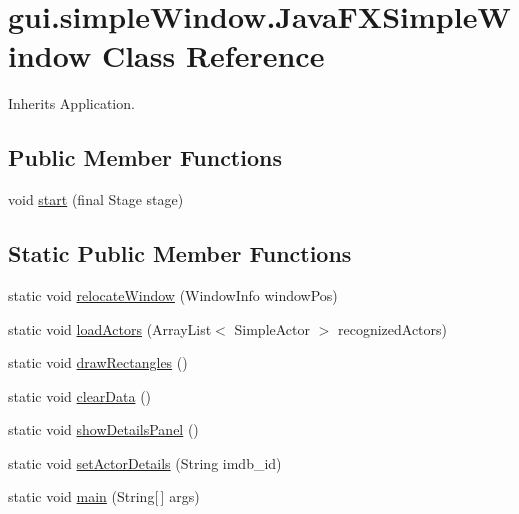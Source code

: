 \hypertarget{classgui_1_1simple_window_1_1_java_f_x_simple_window}{}\section{gui.\+simple\+Window.\+Java\+F\+X\+Simple\+Window Class Reference}
\label{classgui_1_1simple_window_1_1_java_f_x_simple_window}


Inherits Application.

\subsection*{Public Member Functions}
\begin{DoxyCompactItemize}
\item 
void \hyperlink{classgui_1_1simple_window_1_1_java_f_x_simple_window_a7b20469c1f1382b5d082c8ba85676777}{start} (final Stage stage)
\end{DoxyCompactItemize}
\subsection*{Static Public Member Functions}
\begin{DoxyCompactItemize}
\item 
static void \hyperlink{classgui_1_1simple_window_1_1_java_f_x_simple_window_a6e6c7fd72c5d662619c16bbeb2050e3f}{relocate\+Window} (Window\+Info window\+Pos)
\item 
static void \hyperlink{classgui_1_1simple_window_1_1_java_f_x_simple_window_a0e3bf876c67e39d1f7ae354c971ecf7f}{load\+Actors} (Array\+List$<$ Simple\+Actor $>$ recognized\+Actors)
\item 
static void \hyperlink{classgui_1_1simple_window_1_1_java_f_x_simple_window_a8e476138f5131bf777c43baaa51d7028}{draw\+Rectangles} ()
\item 
static void \hyperlink{classgui_1_1simple_window_1_1_java_f_x_simple_window_a5e73d1d6c1d7f6ad7e262d40e41b8a39}{clear\+Data} ()
\item 
static void \hyperlink{classgui_1_1simple_window_1_1_java_f_x_simple_window_a04c15534cde88328f9b6933774fa87e3}{show\+Details\+Panel} ()
\item 
static void \hyperlink{classgui_1_1simple_window_1_1_java_f_x_simple_window_abcf21b43abf2d83b9714da096ca0bd7b}{set\+Actor\+Details} (String imdb\+\_\+id)
\item 
static void \hyperlink{classgui_1_1simple_window_1_1_java_f_x_simple_window_a2a054fd5fc54fcd351989ca27cb20f58}{main} (String\mbox{[}$\,$\mbox{]} args)
\end{DoxyCompactItemize}
